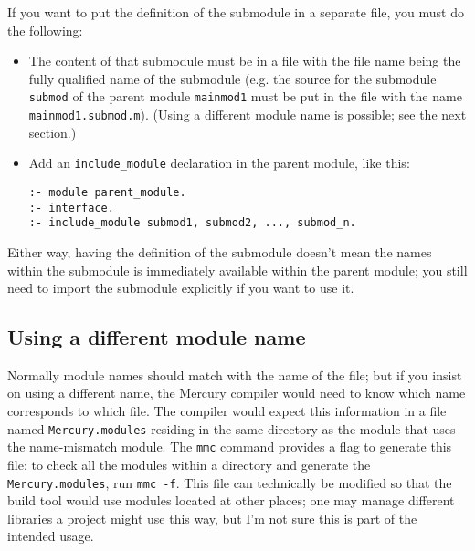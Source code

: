 If you want to put the definition of the submodule in a separate file, you must do the following:

\begin{itemize}
\item The content of that submodule must be in a file with the file name being the fully qualified name of the submodule (e.g. the source for the submodule \texttt{submod} of the parent module \texttt{mainmod1} must be put in the file with the name \texttt{mainmod1.submod.m}). (Using a different module name is possible; see the next section.)
\item Add an \texttt{include\_module} declaration in the parent module, like this:
\begin{lstlisting}[language=Mercury]
:- module parent_module.
:- interface.
:- include_module submod1, submod2, ..., submod_n.
\end{lstlisting}
\end{itemize}

Either way, having the definition of the submodule doesn't mean the names within the submodule is immediately available within the parent module; you still need to import the submodule explicitly if you want to use it.


\subsection{Using a different module name}

Normally module names should match with the name of the file; but if you insist on using a different name, the Mercury compiler would need to know which name corresponds to which file. The compiler would expect this information in a file named \texttt{Mercury.modules} residing in the same directory as the module that uses the name-mismatch module. The \texttt{mmc} command provides a flag to generate this file: to check all the modules within a directory and generate the \texttt{Mercury.modules}, run \texttt{mmc -f}. This file can technically be modified so that the build tool would use modules located at other places; one may manage different libraries a project might use this way, but I'm not sure this is part of the intended usage.




